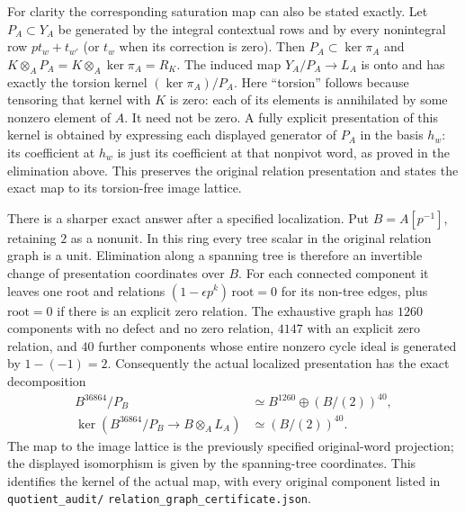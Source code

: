 For clarity the corresponding saturation map can also be
stated exactly. Let $P_A\subset Y_A$ be generated by the
integral contextual rows and by every nonintegral row
$pt_w+t_{w'}$ (or $t_w$ when its correction is zero).
Then $P_A\subset\ker\pi_A$ and
$K\otimes_AP_A=K\otimes_A\ker\pi_A=R_K$.
The induced map $Y_A/P_A\to L_A$ is onto and has exactly
the torsion kernel $(\ker\pi_A)/P_A$.
Here ``torsion'' follows because tensoring that kernel with
$K$ is zero: each of its elements is annihilated by some
nonzero element of $A$. It need not be zero. A fully explicit
presentation of this kernel is obtained by expressing each
displayed generator of $P_A$ in the basis $h_w$: its
coefficient at $h_w$ is just its coefficient at that nonpivot
word, as proved in the elimination above. This preserves
the original relation presentation and states the exact
map to its torsion-free image lattice.

There is a sharper exact answer after a specified
localization. Put $B=A[p^{-1}]$, retaining $2$ as a
nonunit. In this ring every tree scalar in the original
relation graph is a unit. Elimination along a spanning
tree is therefore an invertible change of presentation
coordinates over $B$. For each connected component it
leaves one root and relations
$(1-\epsilon p^k)\,\mathrm{root}=0$ for its non-tree
edges, plus $\mathrm{root}=0$ if there is an explicit
zero relation. The exhaustive graph has $1260$ components
with no defect and no zero relation, $4147$ with an
explicit zero relation, and $40$ further components
whose entire nonzero cycle ideal is generated by
$1-(-1)=2$. Consequently the actual localized
presentation has the exact decomposition
\begin{equation}\label{eq:full-localized-two-torsion}
\begin{aligned}
 B^{36864}/P_B&\simeq B^{1260}\oplus(B/(2))^{40},\\
 \ker(B^{36864}/P_B\longrightarrow B\otimes_A L_A)
       &\simeq(B/(2))^{40}.
\end{aligned}
\end{equation}
The map to the image lattice is the previously specified
original-word projection; the displayed isomorphism is
given by the spanning-tree coordinates. This identifies
the kernel of the actual map, with every original
component listed in
\texttt{quotient\_audit/}\allowbreak
\texttt{relation\_graph\_certificate.json}.

